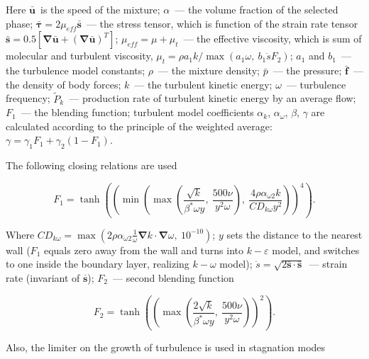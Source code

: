 \documentclass[sensors,article,submit,moreauthors,pdftex]{Definitions/mdpi}
\begin{document}
\begin{paracol}{2}
\linenumbers
\switchcolumn

Here $\bar{\boldsymbol{u}}$~is the speed of the mixture; $ \alpha $~--- the volume fraction of the selected phase; $\bar{\boldsymbol{\tau}} = 2 \mu_{eff} \bar{\boldsymbol{s}}$~--- the stress tensor, which is function of the strain rate tensor $\bar{\boldsymbol{s}} = 0.5 \left[ \boldsymbol{\nabla} \bar{\boldsymbol{u}} + (\boldsymbol{\nabla} \bar{\boldsymbol{u}})^T\right]$; $\mu_{eff} = \mu + \mu_t$~--- the effective viscosity, which is sum of molecular and turbulent viscosity, $\mu_t = \rho a_1 k / \max(a_1 \omega,\ b_1 \dot{s} F_2)$; $a_1$ and $b_1$~--- the turbulence model constants; $\rho$~--- the mixture density; $\bar{p}$~--- the pressure; $ \bar{\boldsymbol{f}} $~--- the density of body forces; $ k $~--- the turbulent kinetic energy; $ \omega $~--- turbulence frequency; $ \widetilde{P}_k $~--- production rate of turbulent kinetic energy by an average flow; $F_1$~--- the blending function; turbulent model coefficients $\alpha_k$, $\alpha_\omega$, $\beta$, $\gamma$ are calculated according to the principle of the weighted average: $\gamma = \gamma_1 F_1 + \gamma_2 (1 - F_1)$.

The following closing relations are used

\begin{equation}
	F_1 = \tanh \left( \left( \min\left( \max \left( \frac{\sqrt{k}}{\beta^* \omega y},\ \frac{500 \nu}{y^2 \omega} \right),\ \frac{4 \rho \alpha_{\omega 2} k}{CD_{k \omega} y^2} \right) \right)^4 \right).
\end{equation}

Where $CD_{k\omega} = \max \left( 2 \rho \alpha_{\omega 2} \frac{1}{\omega} \boldsymbol{\nabla} k \cdot \boldsymbol{\nabla} \omega,\ 10^{-10} \right)$; $y$ sets the distance to the nearest wall ($F_1$ equals zero away from the wall and turns into $k-\varepsilon$ model, and switches to one inside the boundary layer, realizing $k-\omega$ model); $\dot{s} = \sqrt{2 \bar{\boldsymbol{s}} \cdot \bar{\boldsymbol{s}}}$~--- strain rate (invariant of $\overline{\boldsymbol{s}}$); $F_2$~--- second blending function

\begin{equation}
	F_2 = \tanh \left( \left( \max \left( \frac{2 \sqrt{k}}{\beta^* \omega y},\ \frac{500 \nu}{y^2 \omega} \right) \right)^2 \right).
\end{equation}

Also, the limiter on the growth of turbulence is used in stagnation modes


\end{paracol}
\end{document}
